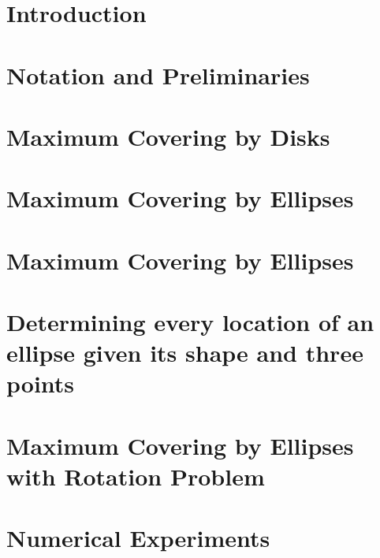 \documentclass[pre-defesa]{packages/icmc}
\begin{document}
\textual

\chapter{Introduction}
\label{chapter:introduction}


\chapter{Notation and Preliminaries}
\label{chapter:definitions}


\chapter{Maximum Covering by Disks}
\label{chapter:pmclp}



\chapter{Maximum Covering by Ellipses}
\label{chapter:mcd2}



\chapter{Maximum Covering by Ellipses}
\label{chapter:mce}


\chapter{Determining every location of an ellipse given its shape and three points}
\label{chapter:e3p}


\chapter{Maximum Covering by Ellipses with Rotation Problem}
\label{chapter:mcer}


\chapter{Numerical Experiments}
\label{chapter:numerical}

\end{document}
